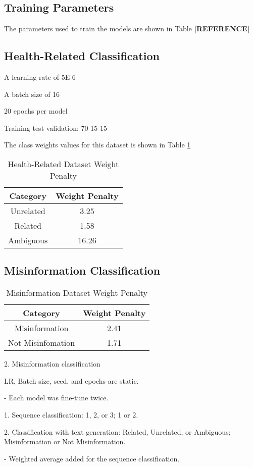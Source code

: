 \subsection{Training Parameters}
The parameters used to train the models are shown in Table \textbf{[REFERENCE]}


\subsection{Health-Related Classification}
A learning rate of 5E-6

A batch size of 16

20 epochs per model

Training-test-validation: 70-15-15

The class weights values for this dataset is shown in Table \ref{table:healthweight}


\begin{table}[H]
	\centering
	\caption{Health-Related Dataset Weight Penalty}
	\begin{tabular}{||c | c||} 
			\hline
			\textbf{Category} & \textbf{Weight Penalty} \\ [1.5ex] 
			\hline
			Unrelated & 3.25 \\ [1ex]
			\hline
			Related & 1.58 \\[1ex]
			\hline
			Ambiguous & 16.26 \\[1ex]
			\hline
		\end{tabular}
	\label{table:healthweight}
\end{table}


\subsection{Misinformation Classification}

\begin{table}[H]
	\centering
	\caption{Misinformation Dataset Weight Penalty}
	\begin{tabular}{||c | c||} 
		\hline
		\textbf{Category} & \textbf{Weight Penalty} \\ [1.5ex] 
		\hline
		Misinformation & 2.41  \\ [1ex]
		\hline
		Not Misinfomation & 1.71  \\[1ex]
		\hline
	\end{tabular}
	\label{table:misinformationweights}
\end{table}

2. Misinformation classification

LR, Batch size, seed, and epochs are static.

- Each model was fine-tune twice.

    1. Sequence classification: 1, 2, or 3; 1 or 2.

    2. Classification with text generation: Related, Unrelated, or Ambiguous; Misinformation or Not Misinformation.

- Weighted average added for the sequence classification.

